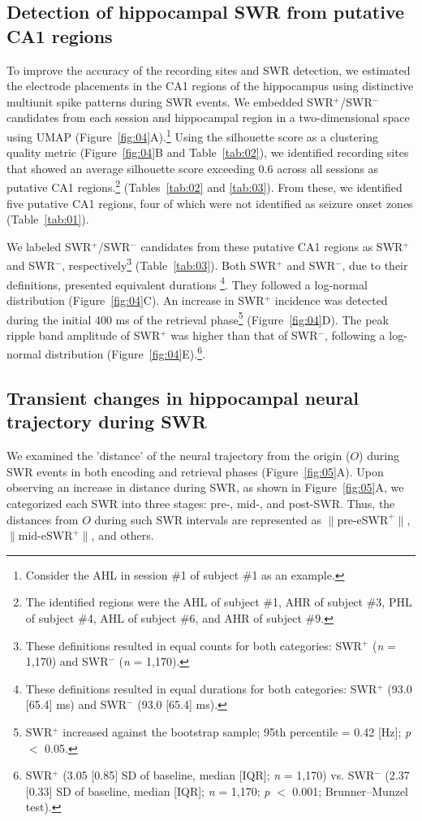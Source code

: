 \subsection{Detection of hippocampal SWR from putative CA1 regions}
To improve the accuracy of the recording sites and SWR detection, we estimated the electrode placements in the CA1 regions of the hippocampus using distinctive multiunit spike patterns during SWR events. We embedded SWR$^+$/SWR$^-$ candidates from each session and hippocampal region in a two-dimensional space using UMAP (Figure~\ref{fig:04}A).\footnote{Consider the AHL in session \#1 of subject \#1 as an example.} Using the silhouette score as a clustering quality metric (Figure~\ref{fig:04}B and Table~\ref{tab:02}), we identified recording sites that showed an average silhouette score exceeding 0.6 across all sessions as putative CA1 regions.\footnote{The identified regions were the AHL of subject \#1, AHR of subject \#3, PHL of subject \#4, AHL of subject \#6, and AHR of subject \#9.} (Tables~\ref{tab:02} and \ref{tab:03}). From these, we identified five putative CA1 regions, four of which were not identified as seizure onset zones (Table~\ref{tab:01}).

We labeled SWR$^+$/SWR$^-$ candidates from these putative CA1 regions as SWR$^+$ and SWR$^-$, respectively\footnote{These definitions resulted in equal counts for both categories: SWR$^+$ (\textit{n} = 1,170) and SWR$^-$ (\textit{n} = 1,170).} (Table~\ref{tab:03}). Both SWR$^+$ and SWR$^-$, due to their definitions, presented equivalent durations \footnote{These definitions resulted in equal durations for both categories: SWR$^+$ (93.0 [65.4] ms) and SWR$^-$ (93.0 [65.4] ms).}. They followed a log-normal distribution (Figure~\ref{fig:04}C). An increase in SWR$^+$ incidence was detected during the initial 400 ms of the retrieval phase\footnote{SWR$^+$ increased against the bootstrap sample; 95th percentile = 0.42 [Hz]; \textit{p} $<$ 0.05.} (Figure~\ref{fig:04}D). The peak ripple band amplitude of SWR$^+$ was higher than that of SWR$^-$, following a log-normal distribution (Figure~\ref{fig:04}E).\footnote{SWR$^+$ (3.05 [0.85] SD of baseline, median [IQR]; \textit{n} = 1,170) vs. SWR$^-$ (2.37 [0.33] SD of baseline, median [IQR]; \textit{n} = 1,170; \textit{p} $<$ 0.001; Brunner--Munzel test).}. 

\subsection{Transient changes in hippocampal neural trajectory during SWR}
We examined the 'distance' of the neural trajectory from the origin ($O$) during SWR events in both encoding and retrieval phases (Figure~\ref{fig:05}A). Upon observing an increase in distance during SWR, as shown in Figure~\ref{fig:05}A, we categorized each SWR into three stages: pre-, mid-, and post-SWR. Thus, the distances from $O$ during such SWR intervals are represented as $\mathrm{\lVert \text{pre-eSWR}^+ \rVert}$, $\mathrm{\lVert \text{mid-eSWR}^+ \rVert}$, and others.

